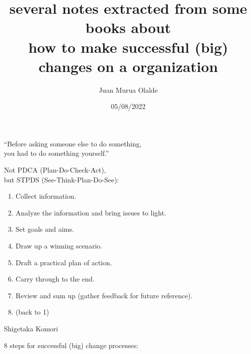 \documentclass[english,14pt,a4paper,final,oneside]{article}
\title{several notes extracted from some books about \\how to make successful (big) changes on a organization}
\author{Juan Murua Olalde}
\date{05/08/2022}
\begin{document}
\begin{center}\begin{LARGE}
\MyTitle
\end{LARGE}\end{center}

\hypersetup{linkcolor=black}

\vspace{1cm}

``Before asking someone else to do something,
\\you had to do something yourself.''

\vspace{1cm}

Not PDCA (Plan-Do-Check-Act),
\\but STPDS (See-Think-Plan-Do-See):
\begin{enumerate}
\item Collect information.
\item Analyze the information and bring issues to light.
\item Set goals and aims.
\item Draw up a winning scenario.
\item Draft a practical plan of action.
\item Carry through to the end.
\item Review and sum up (gather feedback for future reference).
\item (back to 1)
\end{enumerate}

\begin{flushright}Shigetaka Komori\end{flushright}


\vspace{1cm}


8 steps for successful (big) change processes:
\end{document}
